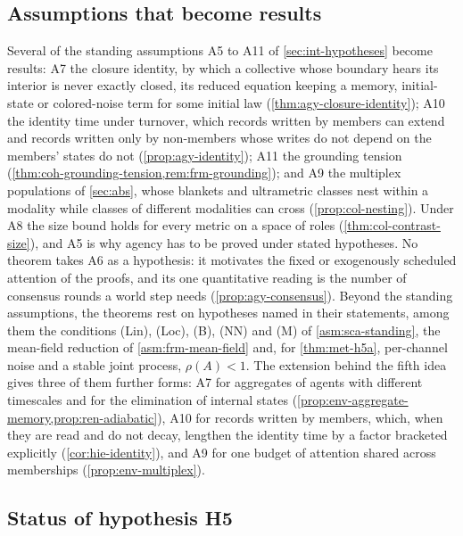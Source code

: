 \subsection{Assumptions that become results}\label{sup:int-assumptions-that-become-results}

Several of the standing assumptions A5 to A11 of \cref{sec:int-hypotheses} become results: A7 the closure identity, by which a collective whose boundary hears its interior is never exactly closed, its reduced equation keeping a memory, initial-state or colored-noise term for some initial law (\cref{thm:agy-closure-identity}); A10 the identity time under turnover, which records written by members can extend and records written only by non-members whose writes do not depend on the members' states do not (\cref{prop:agy-identity}); A11 the grounding tension (\cref{thm:coh-grounding-tension,rem:frm-grounding}); and A9 the multiplex populations of \cref{sec:abs}, whose blankets and ultrametric classes nest within a modality while classes of different modalities can cross (\cref{prop:col-nesting}). Under A8 the size bound holds for every metric on a space of roles (\cref{thm:col-contrast-size}), and A5 is why agency has to be proved under stated hypotheses. No theorem takes A6 as a hypothesis: it motivates the fixed or exogenously scheduled attention of the proofs, and its one quantitative reading is the number of consensus rounds a world step needs (\cref{prop:agy-consensus}). Beyond the standing assumptions, the theorems rest on hypotheses named in their statements, among them the conditions (Lin), (Loc), (B), (NN) and (M) of \cref{asm:sca-standing}, the mean-field reduction of \cref{asm:frm-mean-field} and, for \cref{thm:met-h5a}, per-channel noise and a stable joint process, $\rho(A)<1$. The extension behind the fifth idea gives three of them further forms: A7 for aggregates of agents with different timescales and for the elimination of internal states (\cref{prop:env-aggregate-memory,prop:ren-adiabatic}), A10 for records written by members, which, when they are read and do not decay, lengthen the identity time by a factor bracketed explicitly (\cref{cor:hie-identity}), and A9 for one budget of attention shared across memberships (\cref{prop:env-multiplex}).

\subsection{Status of hypothesis H5}\label{sup:int-status-of-hypothesis-h5}

